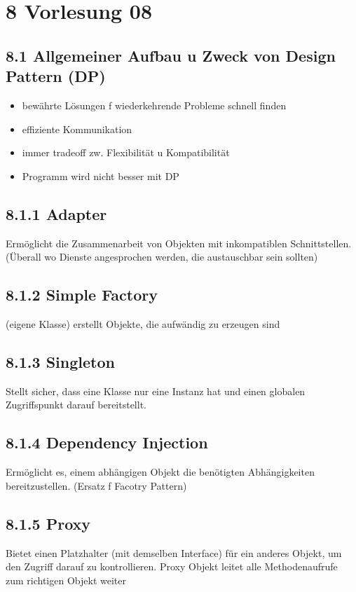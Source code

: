 \documentclass[10pt]{article}
\begin{document}
\section*{8 Vorlesung 08}
\subsection*{8.1 Allgemeiner Aufbau u Zweck von Design Pattern (DP)}
\begin{itemize}
  \item bewährte Lösungen f wiederkehrende Probleme schnell finden
  \item effiziente Kommunikation
  \item immer tradeoff zw. Flexibilität u Kompatibilität
  \item Programm wird nicht besser mit DP
\end{itemize}

\subsection*{8.1.1 Adapter}
Ermöglicht die Zusammenarbeit von Objekten mit inkompatiblen Schnittstellen. (Überall wo Dienste angesprochen werden, die austauschbar sein sollten)

\subsection*{8.1.2 Simple Factory}
(eigene Klasse) erstellt Objekte, die aufwändig zu erzeugen sind

\subsection*{8.1.3 Singleton}
Stellt sicher, dass eine Klasse nur eine Instanz hat und einen globalen Zugriffspunkt darauf bereitstellt.

\subsection*{8.1.4 Dependency Injection}
Ermöglicht es, einem abhängigen Objekt die benötigten Abhängigkeiten bereitzustellen. (Ersatz f Facotry Pattern)

\subsection*{8.1.5 Proxy}
Bietet einen Platzhalter (mit demselben Interface) für ein anderes Objekt, um den Zugriff darauf zu kontrollieren. Proxy Objekt leitet alle Methodenaufrufe zum richtigen Objekt weiter
\end{document}
